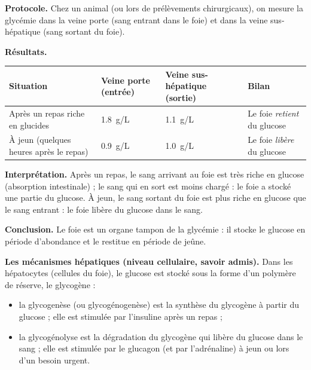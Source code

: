 \documentclass[11pt]{article}
\renewcommand{\arraystretch}{1.25}
\newcommand{\cle}[1]{{\popxbold\color{popdark}#1}}
\begin{document}
\begin{experience}
\textbf{Protocole.} Chez un animal (ou lors de prélèvements chirurgicaux), on mesure la glycémie dans la veine porte (sang entrant dans le foie) et dans la veine sus-hépatique (sang sortant du foie).

\textbf{Résultats.}

\begin{center}
\renewcommand{\arraystretch}{1,3}
\begin{tabularx}{\linewidth}{|l|X|X|X|}
\hline
\rowcolor{popblueL} \textbf{Situation} & \textbf{Veine porte (entrée)} & \textbf{Veine sus-hépatique (sortie)} & \textbf{Bilan} \\
\hline
Après un repas riche en glucides & \SI{1,8}{g/L} & \SI{1,1}{g/L} & Le foie \emph{retient} du glucose \\
\hline
À jeun (quelques heures après le repas) & \SI{0,9}{g/L} & \SI{1,0}{g/L} & Le foie \emph{libère} du glucose \\
\hline
\end{tabularx}
\end{center}

\textbf{Interprétation.} Après un repas, le sang arrivant au foie est très riche en glucose (absorption intestinale) ; le sang qui en sort est moins chargé : le foie a \cle{stocké} une partie du glucose. À jeun, le sang sortant du foie est plus riche en glucose que le sang entrant : le foie \cle{libère} du glucose dans le sang.

\textbf{Conclusion.} Le foie est un organe \cle{tampon} de la glycémie : il stocke le glucose en période d'abondance et le restitue en période de jeûne.
\end{experience}

\textbf{Les mécanismes hépatiques (niveau cellulaire, savoir admis).} Dans les hépatocytes (cellules du foie), le glucose est stocké sous la forme d'un polymère de réserve, le \cle{glycogène} :
\begin{itemize}
\item la \cle{glycogenèse} (ou glycogénogenèse) est la synthèse du glycogène à partir du glucose ; elle est stimulée par l'\cle{insuline} après un repas ;
\item la \cle{glycogénolyse} est la dégradation du glycogène qui libère du glucose dans le sang ; elle est stimulée par le \cle{glucagon} (et par l'adrénaline) à jeun ou lors d'un besoin urgent.
\end{itemize}
\end{document}

